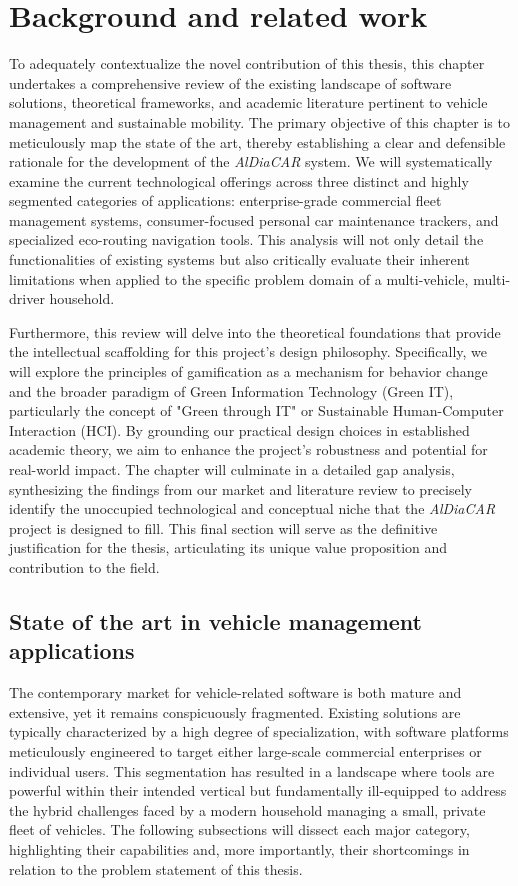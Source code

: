 \chapter{Background and related work}

To adequately contextualize the novel contribution of this thesis, this chapter undertakes a comprehensive review of the existing landscape of software solutions, theoretical frameworks, and academic literature pertinent to vehicle management and sustainable mobility. The primary objective of this chapter is to meticulously map the state of the art, thereby establishing a clear and defensible rationale for the development of the \textit{AlDiaCAR} system. We will systematically examine the current technological offerings across three distinct and highly segmented categories of applications: enterprise-grade commercial fleet management systems, consumer-focused personal car maintenance trackers, and specialized eco-routing navigation tools. This analysis will not only detail the functionalities of existing systems but also critically evaluate their inherent limitations when applied to the specific problem domain of a multi-vehicle, multi-driver household.

\textgap

Furthermore, this review will delve into the theoretical foundations that provide the intellectual scaffolding for this project's design philosophy. Specifically, we will explore the principles of gamification as a mechanism for behavior change and the broader paradigm of Green Information Technology (Green IT), particularly the concept of "Green through IT" or Sustainable Human-Computer Interaction (HCI). By grounding our practical design choices in established academic theory, we aim to enhance the project's robustness and potential for real-world impact. The chapter will culminate in a detailed gap analysis, synthesizing the findings from our market and literature review to precisely identify the unoccupied technological and conceptual niche that the \textit{AlDiaCAR} project is designed to fill. This final section will serve as the definitive justification for the thesis, articulating its unique value proposition and contribution to the field.

\section{State of the art in vehicle management applications}

The contemporary market for vehicle-related software is both mature and extensive, yet it remains conspicuously fragmented. Existing solutions are typically characterized by a high degree of specialization, with software platforms meticulously engineered to target either large-scale commercial enterprises or individual users. This segmentation has resulted in a landscape where tools are powerful within their intended vertical but fundamentally ill-equipped to address the hybrid challenges faced by a modern household managing a small, private fleet of vehicles. The following subsections will dissect each major category, highlighting their capabilities and, more importantly, their shortcomings in relation to the problem statement of this thesis.

